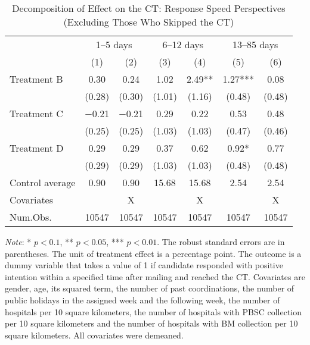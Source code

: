\documentclass[12pt, a4paper]{article}
\begin{document}
\begin{table}[H]
\begin{threeparttable}
\begin{tablenotes}
\end{tablenotes}
\end{threeparttable}
\end{table}

\begin{table}[H]

\caption{\label{tab:lm-test-time-decompose-noskip}Decomposition of Effect on the CT: Response Speed Perspectives (Excluding Those Who Skipped the CT)}
\centering
\fontsize{8}{10}\selectfont
\begin{threeparttable}
\begin{tabular}[t]{lcccccc}
\toprule
\multicolumn{1}{c}{ } & \multicolumn{2}{c}{1--5 days} & \multicolumn{2}{c}{6--12 days} & \multicolumn{2}{c}{13--85 days} \\
\cmidrule(l{3pt}r{3pt}){2-3} \cmidrule(l{3pt}r{3pt}){4-5} \cmidrule(l{3pt}r{3pt}){6-7}
  & (1) & (2) & (3) & (4) & (5) & (6)\\
\midrule
Treatment B & \num{0.30} & \num{0.24} & \num{1.02} & \num{2.49}** & \num{1.27}*** & \num{0.08}\\
 & (\num{0.28}) & (\num{0.30}) & (\num{1.01}) & (\num{1.16}) & (\num{0.48}) & (\num{0.48})\\
Treatment C & \num{-0.21} & \num{-0.21} & \num{0.29} & \num{0.22} & \num{0.53} & \num{0.48}\\
 & (\num{0.25}) & (\num{0.25}) & (\num{1.03}) & (\num{1.03}) & (\num{0.47}) & (\num{0.46})\\
Treatment D & \num{0.29} & \num{0.29} & \num{0.37} & \num{0.62} & \num{0.92}* & \num{0.77}\\
 & (\num{0.29}) & (\num{0.29}) & (\num{1.03}) & (\num{1.03}) & (\num{0.48}) & (\num{0.48})\\
\midrule
Control average & 0.90 & 0.90 & 15.68 & 15.68 & 2.54 & 2.54\\
Covariates &  & X &  & X &  & X\\
Num.Obs. & \num{10547} & \num{10547} & \num{10547} & \num{10547} & \num{10547} & \num{10547}\\
\bottomrule
\end{tabular}
\begin{tablenotes}
\item \emph{Note}: * $p < 0.1$, ** $p < 0.05$, *** $p < 0.01$. The robust standard errors are in parentheses. The unit of treatment effect is a percentage point. The outcome is a dummy variable that takes a value of 1 if candidate responded with positive intention within a specified time after mailing and reached the CT. Covariates are gender, age, its squared term, the number of past coordinations, the number of public holidays in the assigned week and the following week, the number of hospitals per 10 square kilometers, the number of hospitals with PBSC collection per 10 square kilometers and the number of hospitals with BM collection per 10 square kilometers. All covariates were demeaned.
\end{tablenotes}
\end{threeparttable}
\end{table}
\end{document}
